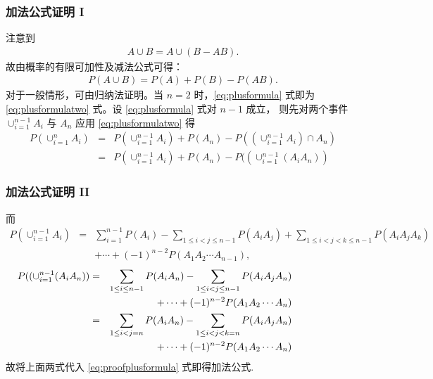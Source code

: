 \begin{frame}%
	\frametitle{加法公式证明 I}
	注意到
	\begin{eqnarray*}
		A\cup B=A\cup (B-AB).
	\end{eqnarray*}
	\pause  故由概率的有限可加性及减法公式可得：
	\begin{eqnarray*} P(A\cup B)=P(A)+P(B)-P(AB).
	\end{eqnarray*}
	\pause 对于一般情形，可由归纳法证明。当 $n=2$ 时，\eqref{eq:plusformula} 式即为
	\eqref{eq:plusformulatwo} 式。设 \eqref{eq:plusformula} 式对 $n-1$ 成立，
	则先对两个事件 $\cup_{i=1}^{n-1} A_i$ 与 $A_n$ 应用
	\eqref{eq:plusformulatwo} 得 \pause
	\begin{eqnarray}\label{eq:proofplusformula}
		P(\cup_{i=1}^nA_i)&=&P(\cup_{i=1}^{n-1}A_i)+P(A_n)-P((\cup_{i=1}^{n-1}A_i)\cap
		A_n)\nonumber\\
		&=&P(\cup_{i=1}^{n-1}A_i)+P(A_n)-P((\cup_{i=1}^{n-1}(A_iA_n))
	\end{eqnarray}
\end{frame}
\begin{frame}%
	\frametitle{加法公式证明 II}

	而{\small \begin{eqnarray*}
		P(\cup_{i=1}^{n-1}A_i)&=&\sum_{i=1}^{n-1}P(A_i)-\sum_{1\leq i<j\leq n-1}P(A_iA_j)+\sum_{1\leq i<j<k\leq n-1}P(A_iA_jA_k)\nonumber\\
		&&
		+\cdots+(-1)^{n-2}P(A_1A_2\cdots
		A_{n-1}),
	\end{eqnarray*}
	\pause
	\begin{eqnarray*}
		\hspace{-2cm} P((\cup_{i=1}^{n-1}(A_iA_n))&=&\sum_{1\leq i\leq n-1}P(A_iA_n)-\sum_{1\leq i<j\leq n-1}P(A_iA_jA_n)\\
		&& +\cdots+(-1)^{n-2}P(A_1A_2\cdots A_n)\\
		&=&\sum_{1\leq i<j=n}P(A_iA_n)-\sum_{1\leq i<j<k=n}P(A_iA_jA_n)\\
		&& +\cdots+(-1)^{n-2}P(A_1A_2\cdots A_n)
	\end{eqnarray*}}
	\pause 故将上面两式代入 \eqref{eq:proofplusformula} 式即得加法公式.
\end{frame}

